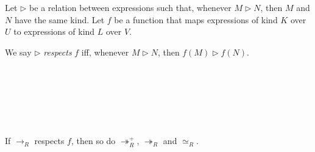 \begin{definition}
Let $\rhd$ be a relation between expressions such that, whenever $M \rhd N$, then $M$ and $N$ have the same kind.  Let $f$ be a function that maps expressions of kind $K$ over $U$ to expressions of kind $L$ over $V$.

We say $\rhd$ \emph{respects} $f$ iff, whenever $M \rhd N$, then $f(M) \rhd f(N)$.
\end{definition}

\begin{code}%
\> \AgdaSymbol{:} \<%
\\
\> \AgdaSymbol{=}  \AgdaSymbol{\{}\AgdaSymbol{\}} \AgdaSymbol{\{}\AgdaSymbol{\}} \AgdaSymbol{\{}\AgdaSymbol{\}}            \<%
\\
%
\\
\> \AgdaSymbol{:}  \AgdaSymbol{\{}\AgdaSymbol{\}} \AgdaSymbol{\{}\AgdaSymbol{\}} \AgdaSymbol{\{}\AgdaSymbol{\}} \AgdaSymbol{\{}\AgdaSymbol{\}} \AgdaSymbol{\{}\AgdaSymbol{\}} \AgdaSymbol{\{}\AgdaSymbol{\}}   \<%
\\
\>[0]\<[2]%
\>[2]\AgdaSymbol{(}        \AgdaSymbol{)}  \<%
\\
\>   \AgdaSymbol{=}  \AgdaSymbol{\{} \AgdaSymbol{\}}       \AgdaSymbol{(} \AgdaSymbol{)} \AgdaSymbol{(} \AgdaSymbol{)}\<%
\end{code}

\begin{lemma}
If $\rightarrow_R$ respects $f$, then so do $\twoheadrightarrow^+_R$, $\twoheadrightarrow_R$ and $\simeq_R$.
\end{lemma}

